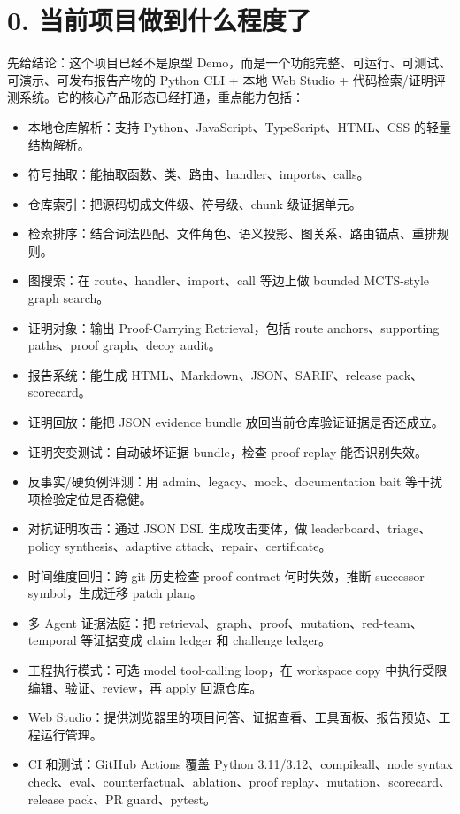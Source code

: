 \documentclass[UTF8,12pt,openany]{ctexbook}
\begin{document}
\section{0. 当前项目做到什么程度了}

先给结论：这个项目已经不是原型 Demo，而是一个功能完整、可运行、可测试、可演示、可发布报告产物的 Python CLI + 本地 Web Studio + 代码检索/证明评测系统。它的核心产品形态已经打通，重点能力包括：\par

\begin{itemize}
\item 本地仓库解析：支持 Python、JavaScript、TypeScript、HTML、CSS 的轻量结构解析。
\item 符号抽取：能抽取函数、类、路由、handler、imports、calls。
\item 仓库索引：把源码切成文件级、符号级、chunk 级证据单元。
\item 检索排序：结合词法匹配、文件角色、语义投影、图关系、路由锚点、重排规则。
\item 图搜索：在 route、handler、import、call 等边上做 bounded MCTS-style graph search。
\item 证明对象：输出 Proof-Carrying Retrieval，包括 route anchors、supporting paths、proof graph、decoy audit。
\item 报告系统：能生成 HTML、Markdown、JSON、SARIF、release pack、scorecard。
\item 证明回放：能把 JSON evidence bundle 放回当前仓库验证证据是否还成立。
\item 证明突变测试：自动破坏证据 bundle，检查 proof replay 能否识别失效。
\item 反事实/硬负例评测：用 admin、legacy、mock、documentation bait 等干扰项检验定位是否稳健。
\item 对抗证明攻击：通过 JSON DSL 生成攻击变体，做 leaderboard、triage、policy synthesis、adaptive attack、repair、certificate。
\item 时间维度回归：跨 git 历史检查 proof contract 何时失效，推断 successor symbol，生成迁移 patch plan。
\item 多 Agent 证据法庭：把 retrieval、graph、proof、mutation、red-team、temporal 等证据变成 claim ledger 和 challenge ledger。
\item 工程执行模式：可选 model tool-calling loop，在 workspace copy 中执行受限编辑、验证、review，再 apply 回源仓库。
\item Web Studio：提供浏览器里的项目问答、证据查看、工具面板、报告预览、工程运行管理。
\item CI 和测试：GitHub Actions 覆盖 Python 3.11/3.12、compileall、node syntax check、eval、counterfactual、ablation、proof replay、mutation、scorecard、release pack、PR guard、pytest。
\end{itemize}
\end{document}
